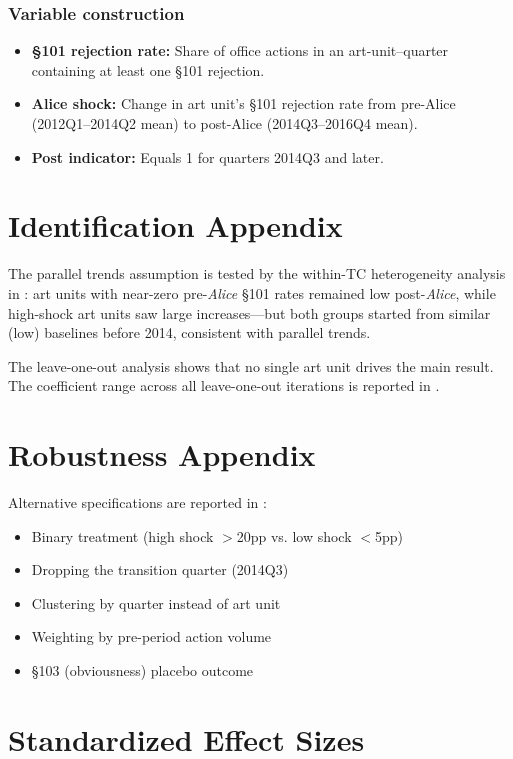 \documentclass[12pt]{article}
\begin{document}
\subsubsection*{Variable construction}
\begin{itemize}
    \item \textbf{\S101 rejection rate:} Share of office actions in an art-unit--quarter containing at least one \S101 rejection.
    \item \textbf{Alice shock:} Change in art unit's \S101 rejection rate from pre-Alice (2012Q1--2014Q2 mean) to post-Alice (2014Q3--2016Q4 mean).
    \item \textbf{Post indicator:} Equals 1 for quarters 2014Q3 and later.
\end{itemize}

\section{Identification Appendix}

The parallel trends assumption is tested by the within-TC heterogeneity analysis in : art units with near-zero pre-\textit{Alice} \S101 rates remained low post-\textit{Alice}, while high-shock art units saw large increases---but both groups started from similar (low) baselines before 2014, consistent with parallel trends.

The leave-one-out analysis shows that no single art unit drives the main result. The coefficient range across all leave-one-out iterations is reported in .

\section{Robustness Appendix}

Alternative specifications are reported in :
\begin{itemize}
    \item Binary treatment (high shock $>$20pp vs. low shock $<$5pp)
    \item Dropping the transition quarter (2014Q3)
    \item Clustering by quarter instead of art unit
    \item Weighting by pre-period action volume
    \item \S103 (obviousness) placebo outcome
\end{itemize}

\section{Standardized Effect Sizes}
\label{sec:sde}


\end{document}
